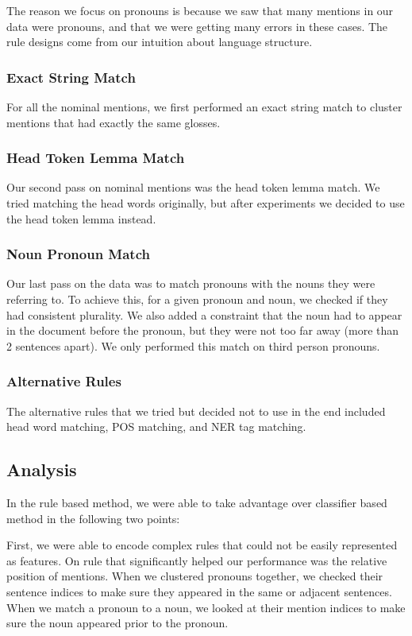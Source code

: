 \documentclass[12pt, twocolumn]{article}
\begin{document}
The reason we focus on pronouns is because we saw that many mentions in our data were pronouns, and that we were getting many errors in these cases. The rule designs come from our intuition about language structure.

\subsubsection{Exact String Match}
For all the nominal mentions, we first performed an exact string match to cluster mentions that had exactly the same glosses.

\subsubsection{Head Token Lemma Match}
Our second pass on nominal mentions was the head token lemma match. We tried matching the head words originally, but after experiments we decided to use the head token lemma instead.

\subsubsection{Noun Pronoun Match}
Our last pass on the data was to match pronouns with the nouns they were referring to. To achieve this, for a given pronoun and noun, we checked if they had consistent plurality. We also added a constraint that the noun had to appear in the document before the pronoun, but they were not too far away (more than 2 sentences apart). We only performed this match on third person pronouns.

\subsubsection{Alternative Rules}
The alternative rules that we tried but decided not to use in the end included head word matching, POS matching, and NER tag matching.

\subsection{Analysis}
In the rule based method, we were able to take advantage over classifier based method in the following two points:

First, we were able to encode complex rules that could not be easily represented as features. On rule that significantly helped our performance was the relative position of mentions. When we clustered pronouns together, we checked their sentence indices to make sure they appeared in the same or adjacent sentences. When we match a pronoun to a noun, we looked at their mention indices to make sure the noun appeared prior to the pronoun. 
\end{document}
